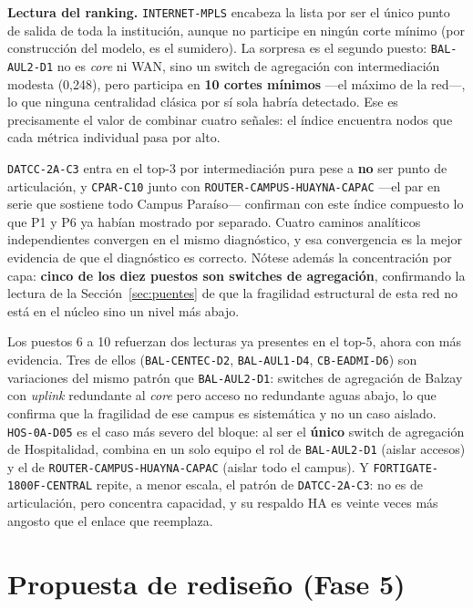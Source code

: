 \documentclass[10pt,a4paper]{extarticle}
\newcommand{\code}[1]{\texttt{\small #1}}
\begin{document}
\textbf{Lectura del ranking.} \code{INTERNET-MPLS} encabeza la lista por ser el único punto
de salida de toda la institución, aunque no participe en ningún corte mínimo (por
construcción del modelo, es el sumidero). La sorpresa es el segundo puesto:
\code{BAL-AUL2-D1} no es \textit{core} ni WAN, sino un switch de agregación con
intermediación modesta (0,248), pero participa en \textbf{10 cortes mínimos} ---el máximo de
la red---, lo que ninguna centralidad clásica por sí sola habría detectado. Ese es
precisamente el valor de combinar cuatro señales: el índice encuentra nodos que cada métrica
individual pasa por alto.

\code{DATCC-2A-C3} entra en el top-3 por intermediación pura pese a \textbf{no} ser punto de
articulación, y \code{CPAR-C10} junto con \code{ROUTER-CAMPUS-HUAYNA-CAPAC} ---el par en
serie que sostiene todo Campus Paraíso--- confirman con este índice compuesto lo que P1 y P6
ya habían mostrado por separado. Cuatro caminos analíticos independientes convergen en el
mismo diagnóstico, y esa convergencia es la mejor evidencia de que el diagnóstico es
correcto. Nótese además la concentración por capa: \textbf{cinco de los diez puestos son
switches de agregación}, confirmando la lectura de la Sección~\ref{sec:puentes} de que la
fragilidad estructural de esta red no está en el núcleo sino un nivel más abajo.

Los puestos 6 a 10 refuerzan dos lecturas ya presentes en el top-5, ahora con más evidencia.
Tres de ellos (\code{BAL-CENTEC-D2}, \code{BAL-AUL1-D4}, \code{CB-EADMI-D6}) son variaciones
del mismo patrón que \code{BAL-AUL2-D1}: switches de agregación de Balzay con \textit{uplink}
redundante al \textit{core} pero acceso no redundante aguas abajo, lo que confirma que la
fragilidad de ese campus es sistemática y no un caso aislado. \code{HOS-0A-D05} es el caso
más severo del bloque: al ser el \textbf{único} switch de agregación de Hospitalidad, combina
en un solo equipo el rol de \code{BAL-AUL2-D1} (aislar accesos) y el de
\code{ROUTER-CAMPUS-HUAYNA-CAPAC} (aislar todo el campus). Y \code{FORTIGATE-1800F-CENTRAL}
repite, a menor escala, el patrón de \code{DATCC-2A-C3}: no es de articulación, pero
concentra capacidad, y su respaldo HA es veinte veces más angosto que el enlace que
reemplaza.

\section{Propuesta de rediseño (Fase 5)}
\label{sec:p11}
\end{document}
